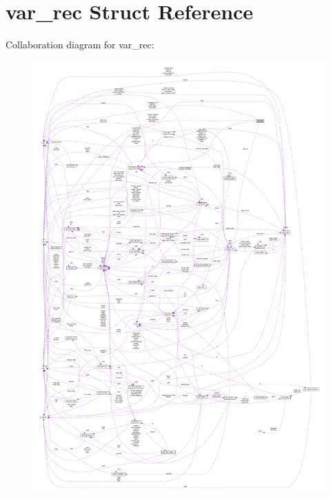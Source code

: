 \hypertarget{structvar__rec}{}\section{var\+\_\+rec Struct Reference}
\label{structvar__rec}


Collaboration diagram for var\+\_\+rec\+:
\nopagebreak
\begin{figure}[H]
\begin{center}
\leavevmode
\includegraphics[width=350pt]{structvar__rec__coll__graph}
\end{center}
\end{figure}

